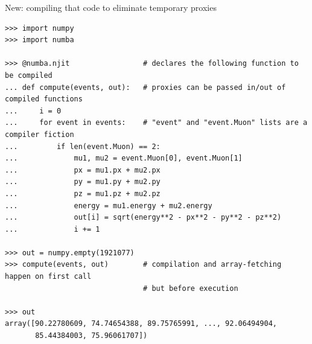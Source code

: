 \documentclass[aspectratio=169]{beamer}
\begin{document}
\begin{frame}[fragile]{New: compiling that code to eliminate temporary proxies}
\vspace{0.15 cm}
\scriptsize
\begin{verbatim}
>>> import numpy
>>> import numba

>>> @numba.njit                 # declares the following function to be compiled
... def compute(events, out):   # proxies can be passed in/out of compiled functions
...     i = 0
...     for event in events:    # "event" and "event.Muon" lists are a compiler fiction
...         if len(event.Muon) == 2:
...             mu1, mu2 = event.Muon[0], event.Muon[1]
...             px = mu1.px + mu2.px
...             py = mu1.py + mu2.py
...             pz = mu1.pz + mu2.pz
...             energy = mu1.energy + mu2.energy
...             out[i] = sqrt(energy**2 - px**2 - py**2 - pz**2)
...             i += 1

>>> out = numpy.empty(1921077)
>>> compute(events, out)        # compilation and array-fetching happen on first call
                                # but before execution

>>> out
array([90.22780609, 74.74654388, 89.75765991, ..., 92.06494904,
       85.44384003, 75.96061707])
\end{verbatim}
\end{frame}
\end{document}
